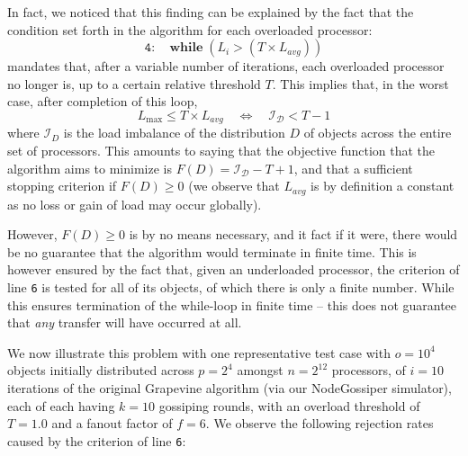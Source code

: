 In fact, we noticed that this finding can be explained by the fact
that the condition set forth in the algorithm for each overloaded
processor:
\[
\mathtt{4:} \quad \mathrm{\mathbf{while}} \; (L_i > (T \times L_{avg}))
\]
mandates that, after a variable number of iterations, each overloaded
processor no longer is, up to a certain relative threshold $T$.
This implies that, in the worst case, after completion of this loop,
\[
\label{eq:imbalance}
L_{\max} \le T \times L_{avg}
\quad \Longleftrightarrow \quad
\mathcal{I_D} < T - 1
\]
where $\mathcal{I}_D$ is the load imbalance of the distribution $D$ of
objects across the entire set of processors. This amounts to
saying that the objective function that the algorithm aims to minimize
is $F(D)=\mathcal{I_D}-T+1$, and that a sufficient stopping criterion
if $F(D)\ge0$ (we observe that $L_{avg}$ is by definition a constant
as no loss or gain of load may occur globally). 

However, $F(D)\ge0$ is by no means necessary, and it fact if it were,
there would be no guarantee that the algorithm would terminate in
finite time. This is however ensured by the fact that, given an
underloaded processor, the criterion of line \texttt{6} is tested for
all of its objects, of which there is only a finite number.
While this ensures termination of the while-loop in finite time --
this does not guarantee that \emph{any} transfer will have occurred at
all.

We now illustrate this problem with one representative test case
with $o=10^4$ objects initially distributed across $p=2^4$
amongst $n=2^{12}$ processors, of $i=10$ iterations of the original
Grapevine algorithm (via our \textsf{NodeGossiper} simulator), each of
each having $k=10$ gossiping rounds, with an overload threshold of
$T=1.0$ and a fanout factor of $f=6$.
We observe the following rejection rates caused by the criterion of line \texttt{6}:


